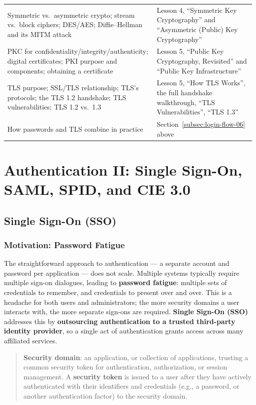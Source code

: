 \documentclass[12pt, a4paper]{article}
\begin{document}
\begin{center}
\begin{tabular}{@{}p{6.7cm}p{6.7cm}@{}}
Symmetric vs.\ asymmetric crypto; stream vs.\ block ciphers; DES/AES; Diffie--Hellman and its MITM attack & Lesson 4, ``Symmetric Key Cryptography'' and ``Asymmetric (Public) Key Cryptography'' \\
PKC for confidentiality/integrity/authenticity; digital certificates; PKI purpose and components; obtaining a certificate & Lesson 5, ``Public Key Cryptography, Revisited'' and ``Public Key Infrastructure'' \\
TLS purpose; SSL/TLS relationship; TLS's protocols; the TLS 1.2 handshake; TLS vulnerabilities; TLS 1.2 vs.\ 1.3 & Lesson 5, ``How TLS Works'', the full handshake walkthrough, ``TLS Vulnerabilities'', ``TLS 1.3'' \\
How passwords and TLS combine in practice & Section~\ref{subsec:login-flow-06} above \\
\bottomrule
\end{tabular}
\end{center}



\section{Authentication II: Single Sign-On, SAML, SPID, and CIE 3.0}

\subsection{Single Sign-On (SSO)}

\subsubsection{Motivation: Password Fatigue}
The straightforward approach to authentication --- a separate account and password per application --- does not scale. Multiple systems typically require multiple sign-on dialogues, leading to \textbf{password fatigue}: multiple sets of credentials to remember, and credentials to present over and over. This is a headache for both users and administrators; the more security domains a user interacts with, the more separate sign-ons are required. \textbf{Single Sign-On (SSO)} addresses this by \textbf{outsourcing authentication to a trusted third-party identity provider}, so a single act of authentication grants access across many affiliated services.

\begin{quote}
\textcolor{blue!50!black}{\textbf{Security domain}}: an application, or collection of applications, trusting a common security token for authentication, authorization, or session management. A \textbf{security token} is issued to a user after they have actively authenticated with their identifiers and credentials (e.g., a password, or another authentication factor) to the security domain.
\end{quote}
\end{document}
